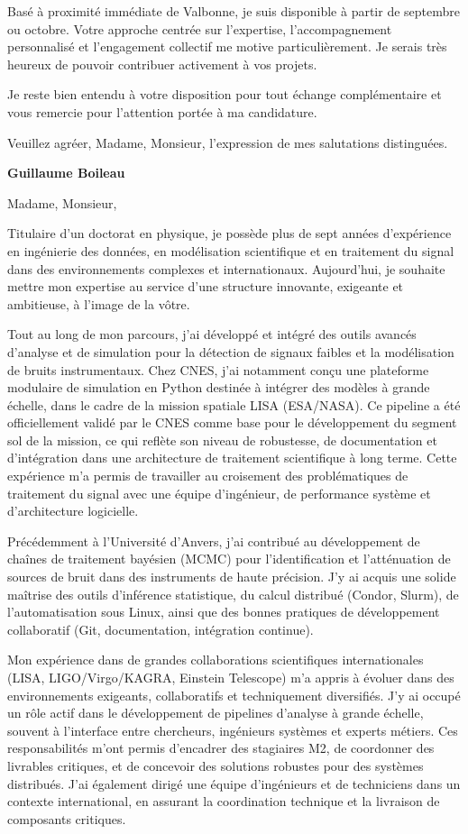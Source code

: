 \documentclass[10pt,a4paper]{../_shared/altacv}
\begin{document}
{Basé à proximité immédiate de Valbonne, je suis disponible à partir de septembre ou octobre. Votre approche centrée sur l'expertise, l'accompagnement personnalisé et l'engagement collectif me motive particulièrement. Je serais très heureux de pouvoir contribuer activement à vos projets.

Je reste bien entendu à votre disposition pour tout échange complémentaire et vous remercie pour l'attention portée à ma candidature.

Veuillez agréer, Madame, Monsieur, l'expression de mes salutations distinguées.

\textbf{Guillaume Boileau}


Madame, Monsieur,

Titulaire d'un doctorat en physique, je possède plus de sept années d'expérience en ingénierie des données, en modélisation scientifique et en traitement du signal dans des environnements complexes et internationaux. Aujourd'hui, je souhaite mettre mon expertise au service d'une structure innovante, exigeante et ambitieuse, à l'image de la vôtre.

Tout au long de mon parcours, j'ai développé et intégré des outils avancés d'analyse et de simulation pour la détection de signaux faibles et la modélisation de bruits instrumentaux. Chez CNES, j'ai notamment conçu une plateforme modulaire de simulation en Python destinée à intégrer des modèles à grande échelle, dans le cadre de la mission spatiale LISA (ESA/NASA). Ce pipeline a été officiellement validé par le CNES comme base pour le développement du segment sol de la mission, ce qui reflète son niveau de robustesse, de documentation et d'intégration dans une architecture de traitement scientifique à long terme. Cette expérience m'a permis de travailler au croisement des problématiques de traitement du signal avec une équipe d'ingénieur, de performance système et d'architecture logicielle.

Précédemment à l'Université d'Anvers, j'ai contribué au développement de chaînes de traitement bayésien (MCMC) pour l'identification et l'atténuation de sources de bruit dans des instruments de haute précision. J'y ai acquis une solide maîtrise des outils d'inférence statistique, du calcul distribué (Condor, Slurm), de l'automatisation sous Linux, ainsi que des bonnes pratiques de développement collaboratif (Git, documentation, intégration continue).

Mon expérience dans de grandes collaborations scientifiques internationales (LISA, LIGO/Virgo/KAGRA, Einstein Telescope) m'a appris à évoluer dans des environnements exigeants, collaboratifs et techniquement diversifiés. J'y ai occupé un rôle actif dans le développement de pipelines d'analyse à grande échelle, souvent à l'interface entre chercheurs, ingénieurs systèmes et experts métiers. Ces responsabilités m'ont permis d'encadrer des stagiaires M2, de coordonner des livrables critiques, et de concevoir des solutions robustes pour des systèmes distribués. J'ai également dirigé une équipe d'ingénieurs et de techniciens dans un contexte international, en assurant la coordination technique et la livraison de composants critiques.

}
\end{document}

